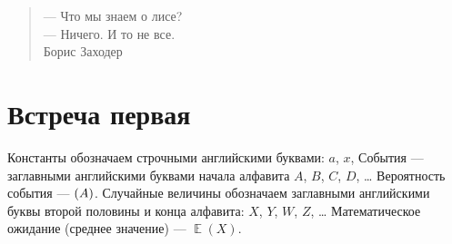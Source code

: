 \documentclass[12pt]{article}
\let\P\relax
\DeclareMathOperator{\P}{\mathbb{P}}
\DeclareMathOperator{\E}{\mathbb{E}}
\begin{document}
\begin{verse}
    \begin{flushright}
        — Что мы знаем о лисе? \\
        — Ничего. И то не все. \\

        Борис Заходер
    \end{flushright}
\end{verse}

\section{Встреча первая}

\begin{leftbar}
Константы обозначаем строчными английскими буквами: $a$, $x$, События ­— заглавными английскими буквами начала алфавита $A$, $B$, $C$, $D$, \ldots{ } Вероятность события — $\P(A)$.
Случайные величины обозначаем заглавными английскими буквы второй половины и конца алфавита: $X$, $Y$, $W$, $Z$, \ldots{ } Математическое ожидание (среднее значение) — $\E(X)$. 
\end{leftbar}
\end{document}
